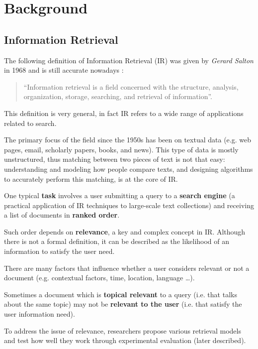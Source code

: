 \newpage
\chapter{Background}

\section{Information Retrieval}

The following definition of Information Retrieval (IR) was given by \textit{Gerard Salton} in 1968 and is still accurate nowadays \cite{croftIR}:

\begin{quote}
``Information retrieval is a field concerned with the structure, analysis, organization, storage, searching, and retrieval of information''.
\end{quote}

This definition is very general, in fact IR refers to a wide range of applications related to search.

The primary focus of the field since the 1950s has been on textual data (e.g. web pages, email, scholarly papers, books, and news). This type of data is mostly unstructured, thus matching between two pieces of text is not that easy: understanding and modeling how people compare texts, and designing algorithms to accurately perform this matching, is at the core of IR.

One typical \textbf{task} involves a user submitting a query to a \textbf{search engine} (a practical application of IR techniques to large-scale text collections) and receiving a list of documents in \textbf{ranked order}.

Such order depends on \textbf{relevance}, a key and complex concept in IR. Although there is not a formal definition, it can be described as the likelihood of an information to satisfy the user need.

There are many factors that influence whether a user considers relevant or not a document (e.g. contextual factors, time, location, language \dots).

Sometimes a document which is \textbf{topical relevant} to a query (i.e. that talks about the same topic) may not be \textbf{relevant to the user} (i.e. that satisfy the user information need).

To address the issue of relevance, researchers propose various retrieval models and test how well they work through experimental evaluation (later described).

